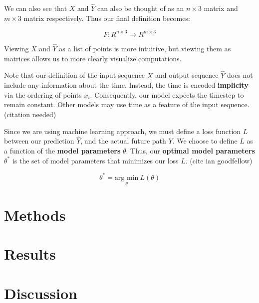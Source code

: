 \documentclass{article}
\begin{document}
We can also see that $X$ and $\hat{Y}$ can also be thought of as an $n \times 3$
matrix and $m \times 3$ matrix respectively. Thus our final definition becomes:

$$ F: R^{n \times 3} \to R^{m \times 3} $$

Viewing $X$ and $\hat{Y}$ as a list of points is more intuitive, but viewing 
them as matrices allows us to more clearly visualize computations.

Note that our definition of the input sequence $X$ and output sequence $\hat{Y}$ 
does not include any information about the time. Instead, the time is encoded
\textbf{implicity} via the ordering of points $x_i$. Consequently, our model
expects the timestep to remain constant. Other models may use time as a feature
of the input sequence. (citation needed)

Since we are using machine learning approach, we must define a loss function $L$
between our prediction $\hat{Y}$, and the actual future path $Y$. We choose to 
define $L$ as a function of the \textbf{model parameters} $\theta$. Thus, our 
\textbf{optimal model parameters} $\theta^*$ is the set of model parameters that 
minimizes our loss $L$. (cite ian goodfellow)

$$ \theta^* = \underset{\theta}{\text{arg min}}\  L(\theta)$$

\section{Methods}
\section{Results}
\section{Discussion}
\end{document}
